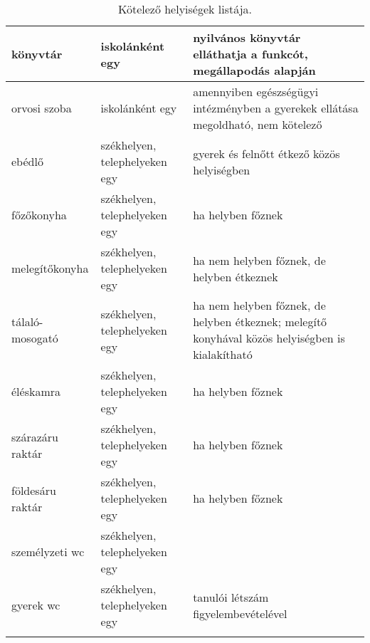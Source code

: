 \begin{longtable}{@{}p{4cm}|p{4cm}|p{6cm}@{}}
    \\ \hline
    könyvtár                      & iskolánként egy                           & nyilvános
    könyvtár elláthatja a funkcót, megállapodás alapján
    \\ \hline
    orvosi szoba                  & iskolánként egy                           & amennyiben
    egészségügyi intézményben a gyerekek ellátása megoldható, nem kötelező                 \\
    \hline
    ebédlő                        & székhelyen, telephelyeken egy             & gyerek és
    felnőtt étkező közös helyiségben
    \\ \hline
    főzőkonyha                    & székhelyen, telephelyeken egy             & ha helyben
    főznek
    \\ \hline
    melegítőkonyha                & székhelyen, telephelyeken egy             & ha nem
    helyben főznek, de helyben étkeznek
    \\ \hline
    tálaló-mosogató               & székhelyen, telephelyeken egy             & ha nem
    helyben főznek, de helyben étkeznek; melegítő konyhával közös helyiségben is
    kialakítható                                                                           \\ \hline
    éléskamra                     & székhelyen, telephelyeken egy             & ha helyben
    főznek
    \\ \hline
    szárazáru raktár              & székhelyen, telephelyeken egy             & ha helyben
    főznek
    \\ \hline
    földesáru raktár              & székhelyen, telephelyeken egy             & ha helyben
    főznek
    \\ \hline
    személyzeti wc                & székhelyen, telephelyeken egy             &

    \\ \hline
    gyerek wc                     & székhelyen, telephelyeken egy & tanulói
    létszám figyelembevételével
    \\

    \caption{Kötelező helyiségek listája.}
    \label{tbl:helyisegek}

\end{longtable}
